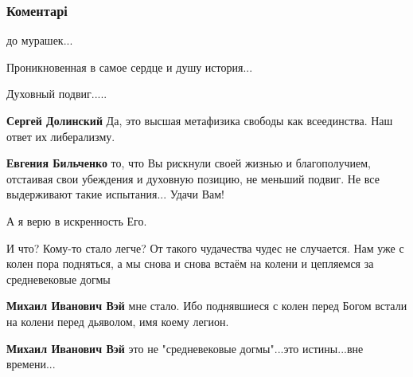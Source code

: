  
 
 
 
 
\subsubsection{Коментарі}

\begin{itemize} %
до мурашек...

Проникновенная в самое сердце и душу история...

Духовный подвиг.....

\begin{itemize} %
\textbf{Сергей Долинский} Да, это высшая метафизика свободы как всеединства. Наш ответ их либерализму.

\textbf{Евгения Бильченко} то, что Вы рискнули своей жизнью и благополучием, отстаивая свои убеждения и духовную позицию, не меньший подвиг. Не все выдерживают такие испытания... Удачи Вам!
\end{itemize} %

А я верю в искренность Его.


И что? Кому-то стало легче? От такого чудачества чудес не случается. Нам уже с
колен пора подняться, а мы снова и снова встаём на колени и цепляемся за
средневековые догмы

\begin{itemize} %
\textbf{Михаил Иванович Вэй} мне стало. Ибо поднявшиеся с колен перед Богом встали на колени перед дьяволом, имя коему легион.

\textbf{Михаил Иванович Вэй} это не "средневековые догмы"...это истины...вне времени...
\end{itemize} %



\end{itemize}
